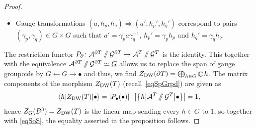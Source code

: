 \documentclass[10pt,a4paper]{amsart}
\DeclareMathOperator{\C}{\mathbb{C}}
\newcommand{\sslash}{\mathbin{/\mkern-6mu/}}
\numberwithin{equation}{section}
\theoremstyle{definition}
\begin{document}
\begin{proof}
\begin{itemize}
 \item Gauge transformations $(a, h_p, h_q) \Rightarrow (a', h_p', h_q')$ correspond to pairs $(\gamma_p, \gamma_q) \in G \times G$ such that $a' = \gamma_pa\gamma_q^{-1}$, $h_p' = \gamma_ph_p$ and $h_q' = \gamma_q h_q$.
 \end{itemize}
 The restriction functor $P_{\partial}\colon \mathcal{A}^{\partial T} \sslash \mathcal{G}^{\partial T} \rightarrow \mathcal{A}^{ T} \sslash \mathcal{G}^{ T}$ is the identity. This together with the equivalence $\mathcal{A}^{\partial T} \sslash \mathcal{G}^{\partial T} \simeq \underline{G} $ allows us to replace the span of gauge groupoids by $\underline{G} \leftarrow \underline{G} \rightarrow \bullet$ and thus, we find $Z_{\rm DW}(\partial T) = \bigoplus_{h \in G} \C h$. The matrix components of the morphism $Z_{\rm DW}(T)$ (recall~\eqref{eqSpGrpd}) are given as
 \begin{align*}
 \langle h | Z_{\rm DW}(T) | \bullet \rangle = |P_{\bullet}(\bullet)| \cdot \bigl|\bigl\{h \big| \mathcal{A}^{ T} \sslash \mathcal{G}^{ T} \big| \bullet\bigr\} \bigr| = 1,
 \end{align*}
 hence $Z_G(B^3) = Z_{\rm DW}(T)$ is the linear map sending every $h \in G$ to $1$, so together with \eqref{eqSoS}, the equality asserted in the proposition follows.
\end{proof}
\end{document}
